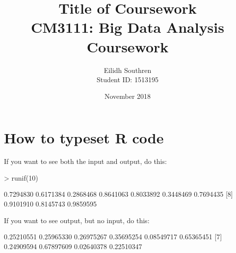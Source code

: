 \documentclass[12pt]{article}         %
\title{\Huge Title of Coursework \\[0.5in] \large CM3111: Big Data Analysis Coursework \\[2in]}  %
\author{Eilidh Southren \\[0.25in] Student ID: 1513195\\[3in]}          %
\date{November 2018}
\begin{document}




\maketitle              %
\pagebreak
\tableofcontents        %
\pagebreak
\section{How to typeset \textsf{R} code}

If you want to see both the input and output, do this:

\begin{Schunk}
\begin{Sinput}
> runif(10)
\end{Sinput}
\begin{Soutput}
 [1] 0.7294830 0.6171384 0.2868468 0.8641063 0.8033892 0.3448469 0.7694435
 [8] 0.9101910 0.8145743 0.9859595
\end{Soutput}
\end{Schunk}

If you want to see output, but no input, do this:

\begin{Schunk}
\begin{Soutput}
 [1] 0.25210551 0.25965330 0.26975267 0.35695254 0.08549717 0.65365451
 [7] 0.24909594 0.67897609 0.02640378 0.22510347
\end{Soutput}
\end{Schunk}
\end{document}
